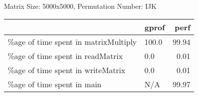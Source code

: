 \documentclass{article}
\begin{document}
    Matrix Size: 5000x5000, Permutation Number: IJK \\
    \begin{tabular}{llr}
\hline
                                      & gprof   &   perf \\
\hline
 \%age of time spent in matrixMultiply & 100.0   &  99.94 \\
 \%age of time spent in readMatrix     & 0.0     &   0.01 \\
 \%age of time spent in writeMatrix    & 0.0     &   0.01 \\
 \%age of time spent in main           & N/A     &  99.97 \\
\hline
\end{tabular}
    
\end{document}
